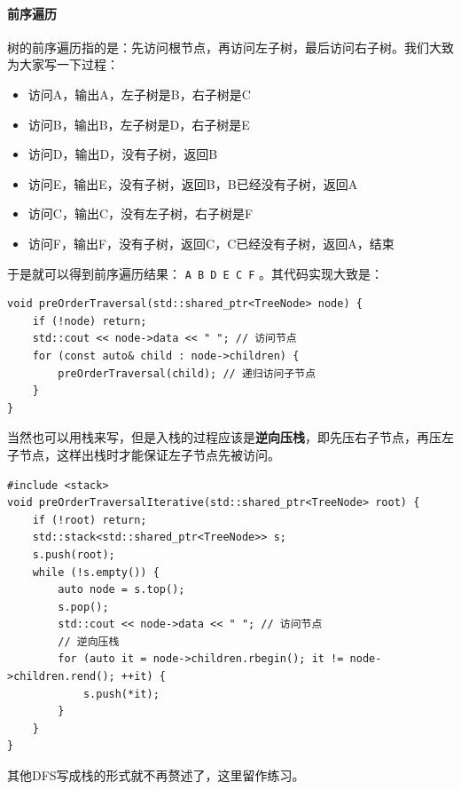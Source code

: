 \paragraph{前序遍历} 树的前序遍历指的是：先访问根节点，再访问左子树，最后访问右子树。我们大致为大家写一下过程：
\begin{itemize}
    \item 访问A，输出A，左子树是B，右子树是C
    \item 访问B，输出B，左子树是D，右子树是E
    \item 访问D，输出D，没有子树，返回B
    \item 访问E，输出E，没有子树，返回B，B已经没有子树，返回A
    \item 访问C，输出C，没有左子树，右子树是F
    \item 访问F，输出F，没有子树，返回C，C已经没有子树，返回A，结束
\end{itemize}
于是就可以得到前序遍历结果： \texttt{A B D E C F} 。其代码实现大致是：
\begin{verbatim}
void preOrderTraversal(std::shared_ptr<TreeNode> node) {
    if (!node) return;
    std::cout << node->data << " "; // 访问节点
    for (const auto& child : node->children) {
        preOrderTraversal(child); // 递归访问子节点
    }
}
\end{verbatim}

当然也可以用栈来写，但是入栈的过程应该是\textbf{逆向压栈}，即先压右子节点，再压左子节点，这样出栈时才能保证左子节点先被访问。
\begin{verbatim}
#include <stack>
void preOrderTraversalIterative(std::shared_ptr<TreeNode> root) {
    if (!root) return;
    std::stack<std::shared_ptr<TreeNode>> s;
    s.push(root);
    while (!s.empty()) {
        auto node = s.top();
        s.pop();
        std::cout << node->data << " "; // 访问节点
        // 逆向压栈
        for (auto it = node->children.rbegin(); it != node->children.rend(); ++it) {
            s.push(*it);
        }
    }
}
\end{verbatim}
其他DFS写成栈的形式就不再赘述了，这里留作练习。

